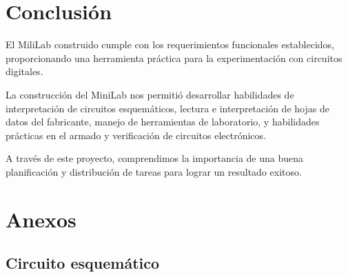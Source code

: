\documentclass[12pt,a4paper]{article}
\begin{document}
\section{Conclusión}
El MiliLab construido cumple con los requerimientos funcionales establecidos, proporcionando una herramienta práctica
para la experimentación con circuitos digitales.

La construcción del MiniLab nos permitió desarrollar habilidades de interpretación de circuitos esquemáticos, lectura
e interpretación de hojas de datos del fabricante, manejo de herramientas de laboratorio, y habilidades prácticas en
el armado y verificación de circuitos electrónicos.

A través de este proyecto, comprendimos la importancia de una buena planificación y distribución de tareas para lograr un resultado exitoso. 

\section{Anexos}
\subsection{Circuito esquemático}\label{anexo:circuito}


\end{document}
